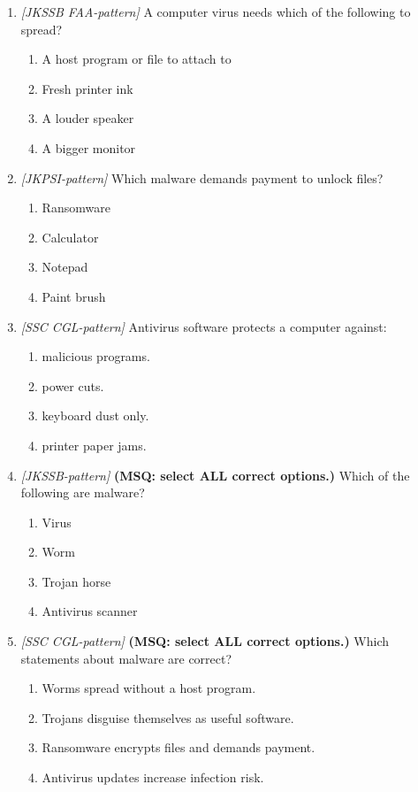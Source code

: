 \documentclass[11pt]{article}
\begin{document}
\begin{enumerate}[label=\textbf{Q\arabic*.}, leftmargin=*]
\item \textit{[JKSSB FAA-pattern]} A computer virus needs which of the following to spread?
  \begin{enumerate}[label=\Alph*.]
    \item A host program or file to attach to
    \item Fresh printer ink
    \item A louder speaker
    \item A bigger monitor
  \end{enumerate}
\item \textit{[JKPSI-pattern]} Which malware demands payment to unlock files?
  \begin{enumerate}[label=\Alph*.]
    \item Ransomware
    \item Calculator
    \item Notepad
    \item Paint brush
  \end{enumerate}
\item \textit{[SSC CGL-pattern]} Antivirus software protects a computer against:
  \begin{enumerate}[label=\Alph*.]
    \item malicious programs.
    \item power cuts.
    \item keyboard dust only.
    \item printer paper jams.
  \end{enumerate}
\item \textit{[JKSSB-pattern]} \textbf{(MSQ: select ALL correct options.)} Which of the following are malware?
  \begin{enumerate}[label=\Alph*.]
    \item Virus
    \item Worm
    \item Trojan horse
    \item Antivirus scanner
  \end{enumerate}
\item \textit{[SSC CGL-pattern]} \textbf{(MSQ: select ALL correct options.)} Which statements about malware are correct?
  \begin{enumerate}[label=\Alph*.]
    \item Worms spread without a host program.
    \item Trojans disguise themselves as useful software.
    \item Ransomware encrypts files and demands payment.
    \item Antivirus updates increase infection risk.
  \end{enumerate}
\end{enumerate}
\def\JKSSBLessonID{42}\def\JKSSBAnswers{0}
\end{document}
